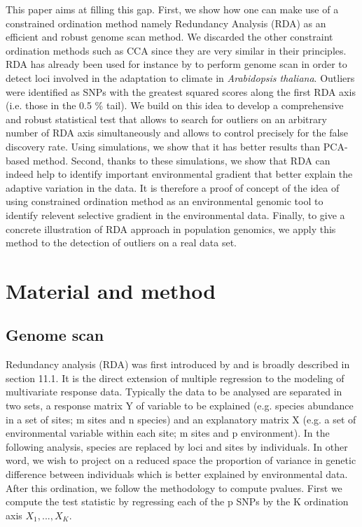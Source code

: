 \documentclass[nogrid]{MBE}%
\begin{document}
	This paper aims at filling this gap. First, we show how one can make use of a constrained ordination method namely Redundancy Analysis (RDA) as an efficient and robust genome scan method. We discarded the other constraint ordination methods such as CCA since they are very similar in their principles. RDA has already been used for instance by \citet{Lasky2012} to perform genome scan in order to detect loci involved in the adaptation to climate in \textit{Arabidopsis thaliana}. Outliers were identified as SNPs with the greatest squared scores along the first RDA axis (i.e. those in the 0.5 \% tail). We build on this idea to develop a comprehensive and robust statistical test that allows to search for outliers on an arbitrary number of RDA axis simultaneously and allows to control precisely for the false discovery rate. Using simulations, we show that it has better results than PCA-based method. Second, thanks to these simulations, we show that RDA can indeed help to identify important environmental gradient that better explain the adaptive variation in the data. It is therefore a proof of concept of the idea of using constrained ordination method as an environmental genomic tool to identify relevent selective gradient in the environmental data. Finally, to give a concrete illustration of RDA approach in population genomics, we apply this method to the detection of outliers on a real data set.

\section{Material and method}

\subsection{Genome scan}

Redundancy analysis (RDA) was first introduced by \citep{Rao1964} and is broadly described in \citep{Legendre2012} section 11.1. It is the direct extension of multiple regression to the modeling of multivariate response data. Typically the data to be analysed are separated in two sets, a response matrix Y of variable to be explained (e.g. species abundance in a set of sites; m sites and n species) and an explanatory matrix X (e.g.  a set of environmental variable within each site; m sites and p environment). 
	In the following analysis, species are replaced by loci and sites by individuals. In other word, we wish to project on a reduced space the proportion of variance in genetic difference between individuals which is better explained by environmental data.
	After this ordination, we follow the \citet{Luu2016} methodology to compute pvalues. First we compute the test statistic by regressing each of the p SNPs by the K ordination axis $X_1, ..., X_K$.
\end{document}

